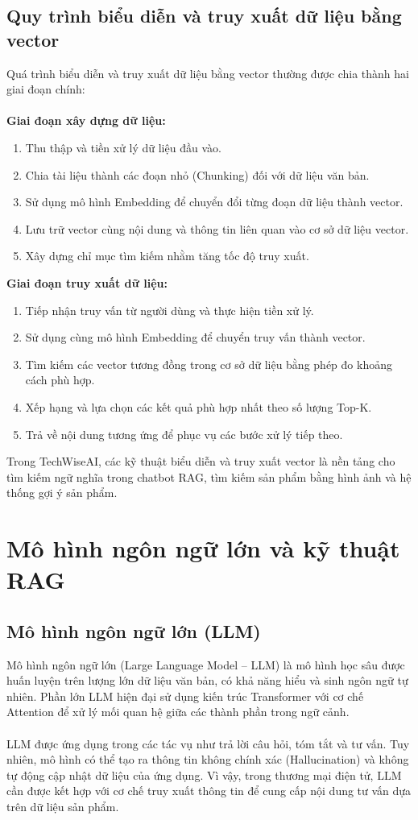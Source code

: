 \documentclass{report}
\begin{document}
\subsection{Quy trình biểu diễn và truy xuất dữ liệu bằng vector}
Quá trình biểu diễn và truy xuất dữ liệu bằng vector thường được chia thành hai giai đoạn chính:\\\\
\textbf{Giai đoạn xây dựng dữ liệu:}
\begin{enumerate}
    \item Thu thập và tiền xử lý dữ liệu đầu vào.
    \item Chia tài liệu thành các đoạn nhỏ (Chunking) đối với dữ liệu văn bản.
    \item Sử dụng mô hình Embedding để chuyển đổi từng đoạn dữ liệu thành vector.
    \item Lưu trữ vector cùng nội dung và thông tin liên quan vào cơ sở dữ liệu vector.
    \item Xây dựng chỉ mục tìm kiếm nhằm tăng tốc độ truy xuất.
\end{enumerate}
\textbf{Giai đoạn truy xuất dữ liệu:}
\begin{enumerate}
    \item Tiếp nhận truy vấn từ người dùng và thực hiện tiền xử lý.
    \item Sử dụng cùng mô hình Embedding để chuyển truy vấn thành vector.
    \item Tìm kiếm các vector tương đồng trong cơ sở dữ liệu bằng phép đo khoảng cách phù hợp.
    \item Xếp hạng và lựa chọn các kết quả phù hợp nhất theo số lượng Top-K.
    \item Trả về nội dung tương ứng để phục vụ các bước xử lý tiếp theo.
\end{enumerate}

Trong TechWiseAI, các kỹ thuật biểu diễn và truy xuất vector là nền tảng cho tìm kiếm ngữ nghĩa trong chatbot RAG, tìm kiếm sản phẩm bằng hình ảnh và hệ thống gợi ý sản phẩm.

\section{Mô hình ngôn ngữ lớn và kỹ thuật RAG}
\subsection{Mô hình ngôn ngữ lớn (LLM)}
Mô hình ngôn ngữ lớn (Large Language Model -- LLM) là mô hình học sâu được huấn luyện trên lượng lớn dữ liệu văn bản, có khả năng hiểu và sinh ngôn ngữ tự nhiên. Phần lớn LLM hiện đại sử dụng kiến trúc Transformer với cơ chế Attention để xử lý mối quan hệ giữa các thành phần trong ngữ cảnh.\\\\
LLM được ứng dụng trong các tác vụ như trả lời câu hỏi, tóm tắt và tư vấn. Tuy nhiên, mô hình có thể tạo ra thông tin không chính xác (Hallucination) và không tự động cập nhật dữ liệu của ứng dụng. Vì vậy, trong thương mại điện tử, LLM cần được kết hợp với cơ chế truy xuất thông tin để cung cấp nội dung tư vấn dựa trên dữ liệu sản phẩm.
\end{document}
